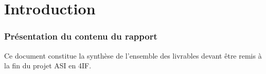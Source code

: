 






\tableofcontents
\listoftodos
\newpage

\part{Introduction}
\label{part:introduction}

\section{Présentation du contenu du rapport}
\label{sec:presentation-du-contenu-du-rapport}

Ce document constitue la synthèse de l'ensemble des livrables devant être remis à la fin du projet ASI en 4IF.  








